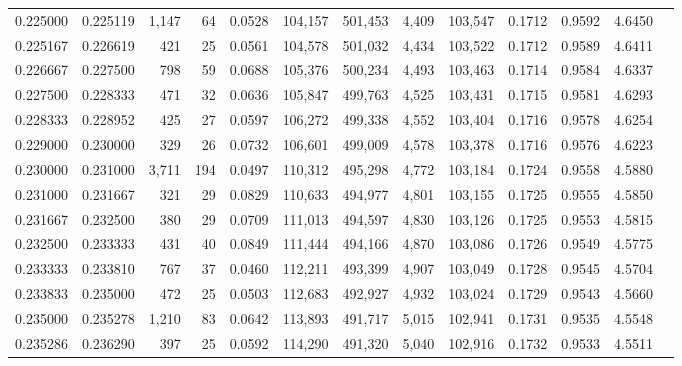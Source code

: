 \begin{tabular}{rrrrrrrrrrrrr}
0.225000 & 0.225119 & 1,147 &  64 &                                     0.0528 & 104,157 & 501,453 &   4,409 & 103,547 & 0.1712 & 0.9592 & 4.6450 \\
0.225167 & 0.226619 &   421 &  25 &                                     0.0561 & 104,578 & 501,032 &   4,434 & 103,522 & 0.1712 & 0.9589 & 4.6411 \\
0.226667 & 0.227500 &   798 &  59 &                                     0.0688 & 105,376 & 500,234 &   4,493 & 103,463 & 0.1714 & 0.9584 & 4.6337 \\
0.227500 & 0.228333 &   471 &  32 &                                     0.0636 & 105,847 & 499,763 &   4,525 & 103,431 & 0.1715 & 0.9581 & 4.6293 \\
0.228333 & 0.228952 &   425 &  27 &                                     0.0597 & 106,272 & 499,338 &   4,552 & 103,404 & 0.1716 & 0.9578 & 4.6254 \\
0.229000 & 0.230000 &   329 &  26 &                                     0.0732 & 106,601 & 499,009 &   4,578 & 103,378 & 0.1716 & 0.9576 & 4.6223 \\
0.230000 & 0.231000 & 3,711 & 194 &                                     0.0497 & 110,312 & 495,298 &   4,772 & 103,184 & 0.1724 & 0.9558 & 4.5880 \\
0.231000 & 0.231667 &   321 &  29 &                                     0.0829 & 110,633 & 494,977 &   4,801 & 103,155 & 0.1725 & 0.9555 & 4.5850 \\
0.231667 & 0.232500 &   380 &  29 &                                     0.0709 & 111,013 & 494,597 &   4,830 & 103,126 & 0.1725 & 0.9553 & 4.5815 \\
0.232500 & 0.233333 &   431 &  40 &                                     0.0849 & 111,444 & 494,166 &   4,870 & 103,086 & 0.1726 & 0.9549 & 4.5775 \\
0.233333 & 0.233810 &   767 &  37 &                                     0.0460 & 112,211 & 493,399 &   4,907 & 103,049 & 0.1728 & 0.9545 & 4.5704 \\
0.233833 & 0.235000 &   472 &  25 &                                     0.0503 & 112,683 & 492,927 &   4,932 & 103,024 & 0.1729 & 0.9543 & 4.5660 \\
0.235000 & 0.235278 & 1,210 &  83 &                                     0.0642 & 113,893 & 491,717 &   5,015 & 102,941 & 0.1731 & 0.9535 & 4.5548 \\
0.235286 & 0.236290 &   397 &  25 &                                     0.0592 & 114,290 & 491,320 &   5,040 & 102,916 & 0.1732 & 0.9533 & 4.5511 \\

\end{tabular}
